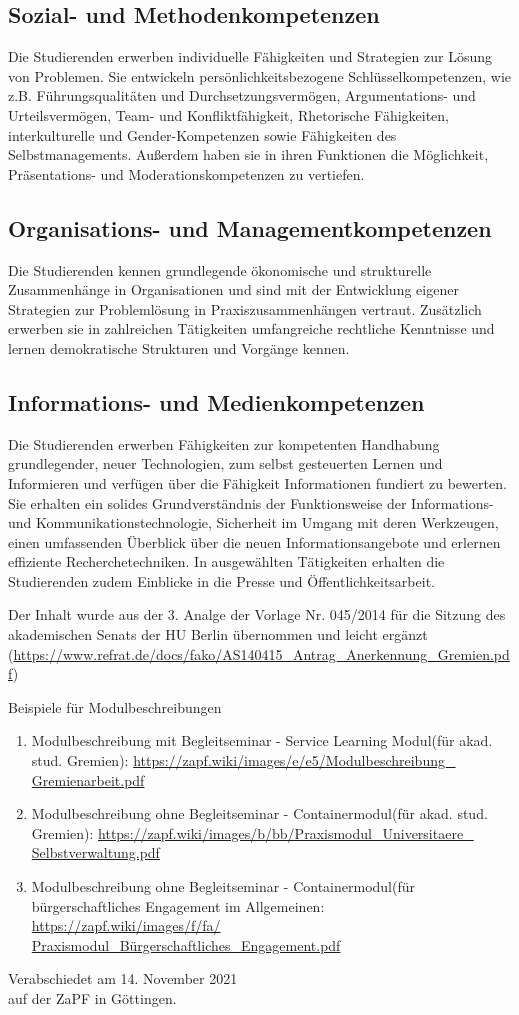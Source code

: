 \documentclass[DIV=calc]{scrartcl}
\begin{document}
\subsection*{Sozial- und Methodenkompetenzen}
Die Studierenden erwerben individuelle Fähigkeiten und Strategien zur Lösung von Problemen. Sie entwickeln persönlichkeitsbezogene Schlüsselkompetenzen, wie z.B. Führungsqualitäten und Durchsetzungsvermögen, Argumentations- und Urteilsvermögen, Team- und Konfliktfähigkeit, Rhetorische Fähigkeiten, interkulturelle und Gender-Kompetenzen sowie Fähigkeiten des Selbstmanagements. Außerdem haben sie in ihren Funktionen die Möglichkeit, Präsentations- und Moderationskompetenzen zu vertiefen.

\subsection*{Organisations- und Managementkompetenzen}
Die Studierenden kennen grundlegende ökonomische und strukturelle Zusammenhänge in Organisationen und sind mit der Entwicklung eigener Strategien zur Problemlösung in Praxiszusammenhängen vertraut. Zusätzlich erwerben sie in zahlreichen Tätigkeiten umfangreiche rechtliche Kenntnisse und lernen demokratische Strukturen und Vorgänge kennen.

\subsection*{Informations- und Medienkompetenzen}
Die Studierenden erwerben Fähigkeiten zur kompetenten Handhabung grundlegender, neuer Technologien, zum selbst gesteuerten Lernen und Informieren und verfügen über die Fähigkeit Informationen fundiert zu bewerten. Sie erhalten ein solides Grundverständnis der Funktionsweise der Informations-und Kommunikationstechnologie, Sicherheit im Umgang mit deren Werkzeugen, einen umfassenden Überblick über die neuen Informationsangebote und erlernen effiziente Recherchetechniken. In ausgewählten Tätigkeiten erhalten die Studierenden zudem Einblicke in die Presse und Öffentlichkeitsarbeit.

Der Inhalt wurde aus der 3. Analge der Vorlage Nr. 045/2014 für die Sitzung des akademischen Senats der HU Berlin übernommen und leicht ergänzt (\url{https://www.refrat.de/docs/fako/AS140415_Antrag_Anerkennung_Gremien.pdf})

Beispiele für Modulbeschreibungen
\begin{enumerate}
\item Modulbeschreibung mit Begleitseminar - Service Learning Modul(für akad. stud. Gremien): \url{https://zapf.wiki/images/e/e5/Modulbeschreibung_ Gremienarbeit.pdf}
\item Modulbeschreibung ohne Begleitseminar - Containermodul(für akad. stud. Gremien): \url{https://zapf.wiki/images/b/bb/Praxismodul_Universitaere_ Selbstverwaltung.pdf}
\item Modulbeschreibung ohne Begleitseminar - Containermodul(für bürgerschaftliches Engagement im Allgemeinen: \url{https://zapf.wiki/images/f/fa/ Praxismodul_Bürgerschaftliches_Engagement.pdf}
\end{enumerate} 


\vfill
\begin{flushright}
	Verabschiedet am 14. November 2021 \\
	auf der ZaPF in Göttingen.
\end{flushright}
\end{document}
